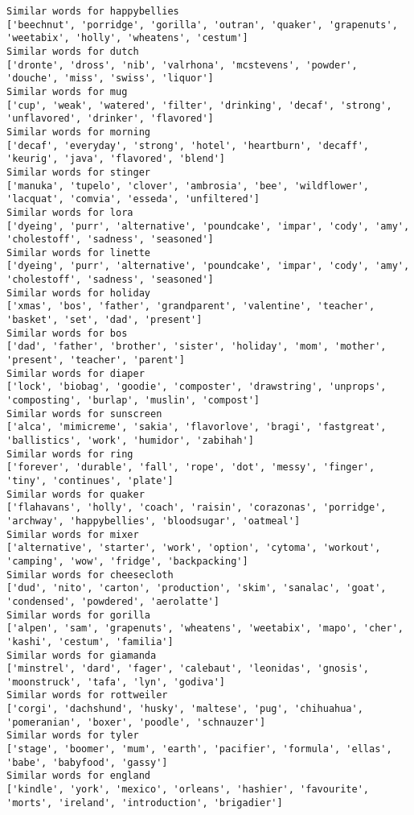 \documentclass[11pt]{article}
\begin{document}
\begin{Verbatim}[commandchars=\\\{\}]
Similar words for happybellies
['beechnut', 'porridge', 'gorilla', 'outran', 'quaker', 'grapenuts', 'weetabix', 'holly', 'wheatens', 'cestum']
Similar words for dutch
['dronte', 'dross', 'nib', 'valrhona', 'mcstevens', 'powder', 'douche', 'miss', 'swiss', 'liquor']
Similar words for mug
['cup', 'weak', 'watered', 'filter', 'drinking', 'decaf', 'strong', 'unflavored', 'drinker', 'flavored']
Similar words for morning
['decaf', 'everyday', 'strong', 'hotel', 'heartburn', 'decaff', 'keurig', 'java', 'flavored', 'blend']
Similar words for stinger
['manuka', 'tupelo', 'clover', 'ambrosia', 'bee', 'wildflower', 'lacquat', 'comvia', 'esseda', 'unfiltered']
Similar words for lora
['dyeing', 'purr', 'alternative', 'poundcake', 'impar', 'cody', 'amy', 'cholestoff', 'sadness', 'seasoned']
Similar words for linette
['dyeing', 'purr', 'alternative', 'poundcake', 'impar', 'cody', 'amy', 'cholestoff', 'sadness', 'seasoned']
Similar words for holiday
['xmas', 'bos', 'father', 'grandparent', 'valentine', 'teacher', 'basket', 'set', 'dad', 'present']
Similar words for bos
['dad', 'father', 'brother', 'sister', 'holiday', 'mom', 'mother', 'present', 'teacher', 'parent']
Similar words for diaper
['lock', 'biobag', 'goodie', 'composter', 'drawstring', 'unprops', 'composting', 'burlap', 'muslin', 'compost']
Similar words for sunscreen
['alca', 'mimicreme', 'sakia', 'flavorlove', 'bragi', 'fastgreat', 'ballistics', 'work', 'humidor', 'zabihah']
Similar words for ring
['forever', 'durable', 'fall', 'rope', 'dot', 'messy', 'finger', 'tiny', 'continues', 'plate']
Similar words for quaker
['flahavans', 'holly', 'coach', 'raisin', 'corazonas', 'porridge', 'archway', 'happybellies', 'bloodsugar', 'oatmeal']
Similar words for mixer
['alternative', 'starter', 'work', 'option', 'cytoma', 'workout', 'camping', 'wow', 'fridge', 'backpacking']
Similar words for cheesecloth
['dud', 'nito', 'carton', 'production', 'skim', 'sanalac', 'goat', 'condensed', 'powdered', 'aerolatte']
Similar words for gorilla
['alpen', 'sam', 'grapenuts', 'wheatens', 'weetabix', 'mapo', 'cher', 'kashi', 'cestum', 'familia']
Similar words for giamanda
['minstrel', 'dard', 'fager', 'calebaut', 'leonidas', 'gnosis', 'moonstruck', 'tafa', 'lyn', 'godiva']
Similar words for rottweiler
['corgi', 'dachshund', 'husky', 'maltese', 'pug', 'chihuahua', 'pomeranian', 'boxer', 'poodle', 'schnauzer']
Similar words for tyler
['stage', 'boomer', 'mum', 'earth', 'pacifier', 'formula', 'ellas', 'babe', 'babyfood', 'gassy']
Similar words for england
['kindle', 'york', 'mexico', 'orleans', 'hashier', 'favourite', 'morts', 'ireland', 'introduction', 'brigadier']

\end{Verbatim}
\end{document}
